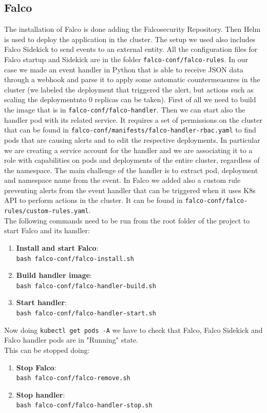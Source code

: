 \subsection{Falco}
The installation of Falco is done adding the Falcosecurity Repository. Then Helm is used to deploy the application in the cluster. The setup we used also includes Falco Sidekick to send events to an external entity. All the configuration files for Falco startup and Sidekick are in the folder \texttt{falco-conf/falco-rules}. In our case we made an event handler in Python that is able to receive JSON data through a webhook and parse it to apply some automatic countermeasures in the cluster (we labeled the deployment that triggered the alert, but actions such as scaling the deploymentnto 0 replicas can be taken). First of all we need to build the image that is in \texttt{falco-conf/falco-handler}. Then we can start also the handler pod with its related service. It requires a set of permissions on the cluster that can be found in \texttt{falco-conf/manifests/falco-handler-rbac.yaml} to find pods that are causing alerts and to edit the respective deployments. In particular we are creating a service account for the handler and we are associating it to a role with capabilities on pods and deployments of the entire cluster, regardless of the namespace. The main challenge of the handler is to extract pod, deployment and namespace name from the event. In Falco we added also a custom rule preventing alerts from the event handler that can be triggered when it uses K8s API to perform actions in the cluster. It can be found in \texttt{falco-conf/falco-rules/custom-rules.yaml}.\\
The following commands need to be run from the root folder of the project to start Falco and its handler:
\begin{enumerate}
    \item \textbf{Install and start Falco}:\\
    \texttt{bash falco-conf/falco-install.sh}
    \item \textbf{Build handler image}:\\
    \texttt{bash falco-conf/falco-handler-build.sh}
    \item \textbf{Start handler}:\\
    \texttt{bash falco-conf/falco-handler-start.sh}
\end{enumerate}
Now doing \texttt{kubectl get pods -A} we have to check that Falco, Falco Sidekick and Falco handler pods are in "Running" state.\\
This can be stopped doing:
\begin{enumerate}
    \item \textbf{Stop Falco}:\\
    \texttt{bash falco-conf/falco-remove.sh}
    \item \textbf{Stop handler}:\\
    \texttt{bash falco-conf/falco-handler-stop.sh}
\end{enumerate}


